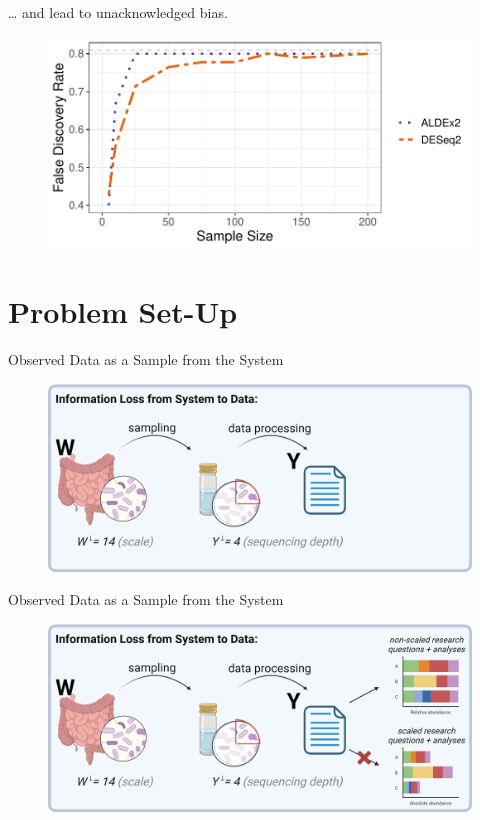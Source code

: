 \documentclass[
  ignorenonframetext,
]{beamer}
\begin{document}
\begin{frame}{\ldots{} and lead to unacknowledged bias.}
\protect\hypertarget{and-lead-to-unacknowledged-bias.}{}
\begin{figure}
  \centering
  \includegraphics[width=4.5in]{figures/unacknowledged_bias.pdf}
\end{figure}
\end{frame}

\hypertarget{problem-set-up}{%
\section{Problem Set-Up}\label{problem-set-up}}

\begin{frame}{Observed Data as a Sample from the System}
\protect\hypertarget{observed-data-as-a-sample-from-the-system}{}
\begin{figure}
  \centering
  \includegraphics[width=4.5in]{figures/intro-fig-first.png}
\end{figure}
\end{frame}

\begin{frame}{Observed Data as a Sample from the System}
\protect\hypertarget{observed-data-as-a-sample-from-the-system-1}{}
\begin{figure}
  \centering
  \includegraphics[width=4.5in]{figures/intro-fig-full.png}
\end{figure}
\end{frame}
\end{document}
